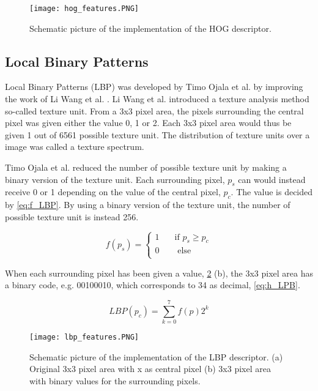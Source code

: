 \FloatBarrier
\begin{figure}[!h]
	\centering
	\texttt{[image: hog\_features.PNG]}
	\caption{Schematic picture of the implementation of the HOG descriptor.
		\label{fig:hog_features}}
\end{figure} 
\FloatBarrier

\subsection{Local Binary Patterns} \label{subsection:LBP}

Local Binary Patterns (LBP) was developed by Timo Ojala et al. \cite{ojala_hog} by improving the work of Li Wang et al. \cite{pre_hog}. Li Wang et al. introduced a texture analysis method so-called texture unit. From a 3x3 pixel area, the pixels surrounding the central pixel was given either the value 0, 1 or 2. Each 3x3 pixel area would thus be given 1 out of 6561 possible texture unit. The distribution of texture units over a image was called a texture spectrum.  

Timo Ojala et al. reduced the number of possible texture unit by making a binary version of the texture unit. Each surrounding pixel, $p_s$ can would instead receive 0 or 1 depending on the value of the central pixel, $p_c$. The value is decided by \cref{eq:f_LBP}. By using a binary version of the texture unit, the number of possible texture unit is instead 256. 

\begin{equation} \label{eq:f_LBP}
f(p_s) = 
 \begin{cases}
 1    & \quad \text{if } p_s \geq p_c\\
 0		& \quad  \text{ else}\\
 \end{cases}
\end{equation}

When each surrounding pixel has been given a value, \cref{fig:lbp_features} (b), the 3x3 pixel area has a binary code, e.g. 00100010, which corresponds to 34 as decimal, \cref{eq:h_LPB}.   

\begin{equation} \label{eq:h_LPB}
LBP(p_c) = \sum_{k=0}^{7} f(p)2^k
\end{equation}

\FloatBarrier
\begin{figure}[!h]
	\centering
	\texttt{[image: lbp\_features.PNG]}
	\caption{Schematic picture of the implementation of the LBP descriptor. (a) Original 3x3 pixel area with x as central pixel (b) 3x3 pixel area with binary values for the surrounding pixels.
		\label{fig:lbp_features}}
\end{figure} 
\FloatBarrier

